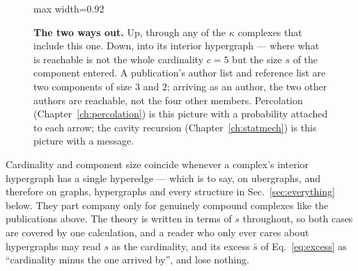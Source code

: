 \begin{figure}[t]
\centering
\begin{adjustbox}{max width=0.92\linewidth}
\end{adjustbox}
\caption{\textbf{The two ways out.} Up, through any of the $\kappa$ complexes
that include this one. Down, into its interior hypergraph --- where what is
reachable is not the whole cardinality $c=5$ but the size $s$ of the component
entered. A publication's author list and reference list are two components of
size $3$ and $2$; arriving as an author, the two other authors are reachable,
not the four other members. Percolation (Chapter~\ref{ch:percolation}) is this
picture with a probability attached to each arrow; the cavity recursion
(Chapter~\ref{ch:statmech}) is this picture with a message.}
\label{fig:twoways}
\end{figure}

Cardinality and component size coincide whenever a complex's interior hypergraph
has a single hyperedge --- which is to say, on ubergraphs, and therefore on
graphs, hypergraphs and every structure in Sec.~\ref{sec:everything} below.
They part company only for genuinely compound complexes like the publications
above.
The theory is written in terms of $s$ throughout, so both cases are covered by
one calculation, and a reader who only ever cares about hypergraphs may read $s$
as the cardinality, and its excess $\bar s$ of Eq.~\eqref{eq:excess} as
``cardinality minus the one arrived by'', and lose nothing.

